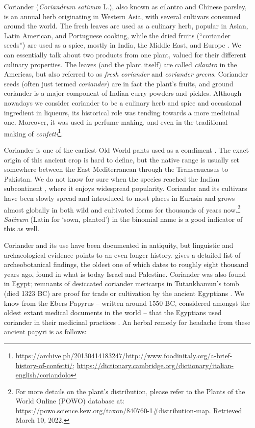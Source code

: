Coriander (\textit{Coriandrum sativum} L.), also known as cilantro and Chinese parsley, is an annual herb originating in Western Asia, with several \glspl{cultivar} consumed around the world. The fresh leaves are used as a culinary herb, popular in Asian, Latin American, and Portuguese cooking, while the dried fruits (``coriander seeds'') are used as a spice, mostly in India, the Middle East, and Europe \autocite{davidson_oxford_2014}. We can essentially talk about two products from one plant, valued for their different culinary properties. The leaves (and the plant itself) are called \textit{cilantro} in the Americas, but also referred to as \textit{fresh coriander} and \textit{coriander greens}. Coriander seeds (often just termed \textit{coriander}) are in fact the plant’s fruits, and ground coriander is a major component of Indian curry powders and pickles. Although nowadays we consider coriander to be a culinary herb and spice and occasional ingredient in liqueurs, its historical role was tending towards a more medicinal one. Moreover, it was used in perfume making, and even in the traditional making of \textit{confetti}\footnote{\url{https://archive.ph/20130414183247/http://www.foodinitaly.org/a-brief-history-of-confetti/}; \url{https://dictionary.cambridge.org/dictionary/italian-english/coriandolo}}.

Coriander is one of the earliest Old World pants used as a condiment \autocite{zohary_domestication_2012}. The exact origin of this ancient crop is hard to define, but the native range is usually set somewhere between the East Mediterranean through the Transcaucasus to Pakistan. We do not know for sure when the species reached the Indian subcontinent \autocite{prance_cultural_2005}, where it enjoys widespread popularity. Coriander and its cultivars have been slowly spread and introduced to most places in Eurasia and grows almost globally in both wild and cultivated forms for thousands of years now.\footnote{For more details on the plant’s distribution, please refer to the Plants of the World Online (POWO) database at: \url{https://powo.science.kew.org/taxon/840760-1\#distribution-map}. Retrieved March 10, 2022.} \textit{Sativum} (Latin for `sown, planted') in the binomial name is a good indicator of this as well.

Coriander and its use have been documented in antiquity, but linguistic and archaeological evidence points to an even longer history. \textcite[163]{zohary_domestication_2012} gives a detailed list of archeobotanical findings, the oldest one of which dates to roughly eight thousand years ago, found in what is today Israel and Palestine. Coriander was also found in Egypt; remnants of desiccated coriander mericarps in Tutankhamun’s tomb (died 1323 BC) are proof for trade or cultivation by the ancient Egyptians \autocite{zohary_domestication_2012}. We know from the Ebers Papyrus – written around 1550 BC, considered amongst the oldest extant medical documents in the world – that the Egyptians used coriander in their medicinal practices \autocite{prance_cultural_2005}. An herbal remedy for headache from these ancient papyri is as follows:

